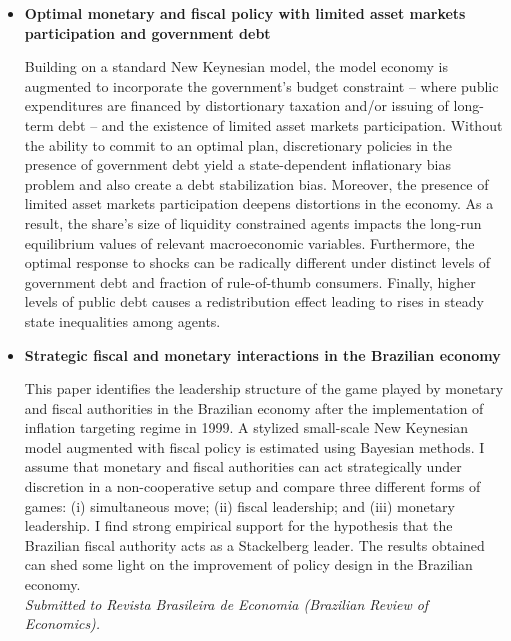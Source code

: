

\begin{itemize}
    \item \textbf{Optimal monetary and fiscal policy with limited asset markets participation and government debt}

    \small{Building on a standard New Keynesian model, the model economy is augmented to incorporate the government's budget constraint -- where public expenditures are financed by distortionary taxation and/or issuing of long-term debt -- and the existence of limited asset markets participation. Without the ability to commit to an optimal plan, discretionary policies in the presence of government debt yield a state-dependent inflationary bias problem and also create a debt stabilization bias. Moreover, the presence of limited asset markets participation deepens distortions in the economy. As a result, the share's size of liquidity constrained agents impacts the long-run equilibrium values of relevant macroeconomic variables. Furthermore, the optimal response to shocks can be radically different under distinct levels of government debt  and fraction of rule-of-thumb consumers. Finally, higher levels of public debt causes a redistribution effect leading to rises in steady state inequalities among agents.}

    \item{\textbf{Strategic fiscal and monetary interactions in the Brazilian economy}

\small{This paper identifies the leadership structure of the game played by monetary and fiscal authorities in the Brazilian economy after the implementation of inflation targeting regime in 1999. A stylized small-scale New Keynesian model augmented with fiscal policy is estimated using Bayesian methods. I assume that monetary and fiscal authorities can act strategically under discretion in a non-cooperative setup and compare three different forms of games: (i) simultaneous move; (ii) fiscal leadership; and (iii) monetary leadership. I find strong empirical support for the hypothesis that the Brazilian fiscal authority acts as a Stackelberg leader. The results obtained can shed some light on the improvement of policy design in the Brazilian economy. \\ \emph{Submitted to Revista Brasileira de Economia (Brazilian Review of Economics).}}}


\end{itemize}
